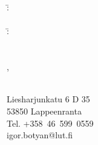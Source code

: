 \begin{titlepage}
\MakeUppercase{\ThesisSchool}

\vspace*{13em}

{\Large \textbf{\MakeUppercase{\ThesisTitleWrapped}}}

\vspace*{11em}

\begin{tabbing}
\ThesisSubject\\
\\
\SupervisorWord:\quad\= \ThesisSupervisor\\
\\
\ExaminersWord:\quad\= \ThesisFirstExaminer\\
\> \ThesisSupervisor\\
\\
\LappeenrantaWord,\ \ThesisDate
\end{tabbing}

\vspace*{2em}

\ThesisAuthor\\
Liesharjunkatu 6 D 35\\
53850 Lappeenranta\\
Tel. +358\ 46\ 599\ 0559\\
igor.botyan{@}lut.fi

\end{titlepage}

\begin{comment}
FINAL THESIS INSTRUCTIONS.

The title page includes the title of the thesis. 
The title must be well-defined and correspond to the content of the thesis. 
A keyword, which expresses something essential about the thesis and has an explicit and specific
meaning, is recommended as the first word. 
Avoid the following: some, review, method, report, study, equipment etc.

===

The title page is the first page of the thesis – page number 1. However, the page numbers are not
shown before the first page of the table of contents. The faculty decides on the information
presented on the cover page. However, the following is always printed on it: university, faculty,
degree programme and/or major subject name of author title of thesis examiners (1st and 2nd).

The points above are not to be used as headings on the title page, e.g. University: Lappeenranta
University of Technology is incorrect, but Lappeenranta University of Technology, Faculty of
Technology is correct. The layout of the title page should be balanced, such as in assignment
reports.
\end{comment}